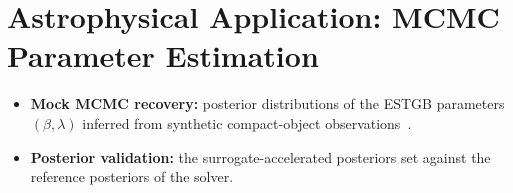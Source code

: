 \section{Astrophysical Application: MCMC Parameter Estimation}
\label{sec:mcmc}

\begin{itemize}
  \item \textbf{Mock MCMC recovery:} posterior distributions of the ESTGB parameters $(\beta, \lambda)$ inferred from synthetic compact-object observations~\citep{Reed2024}.~\citep{TODO_Emcee}
  \item \textbf{Posterior validation:} the surrogate-accelerated posteriors set against the reference posteriors of the solver.~\citep{TODO_PosteriorValidation}
\end{itemize}
